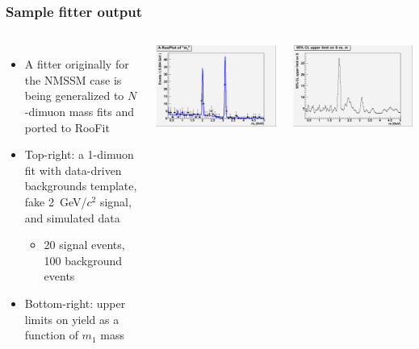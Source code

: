 \documentclass[compress]{beamer}
\begin{document}
\begin{frame}
\frametitle{Sample fitter output}

\begin{columns}
\begin{itemize}
\item A fitter originally for the NMSSM case is being generalized
  to $N$-dimuon mass fits and ported to RooFit

\item Top-right: a 1-dimuon fit with data-driven backgrounds template,
  fake 2~GeV/$c^2$ signal, and simulated data
\begin{itemize}
\item 20 signal events, 100 background events
\end{itemize}

\item Bottom-right: upper limits on yield
  as a function of $m_1$ mass
\end{itemize}

\includegraphics[width=\linewidth]{model_s20b100.png}

\vspace{0.5 cm}
\includegraphics[width=\linewidth]{ul_s20b100_likelihood.png}
\end{columns}
\end{frame}
\end{document}
